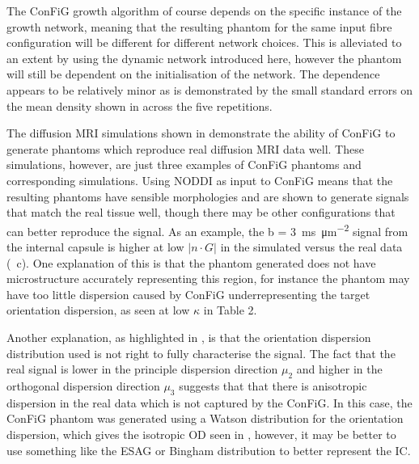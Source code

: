 
The \ac{ConFiG} growth algorithm of course depends on the specific instance of the growth network, meaning that the resulting phantom for the same input fibre configuration will be different for different network choices. This is alleviated to an extent by using the dynamic network introduced here, however the phantom will still be dependent on the initialisation of the network. The dependence appears to be relatively minor as is demonstrated by the small standard errors on the mean density shown in  across the five repetitions.

The diffusion \ac{MRI} simulations shown in  demonstrate the ability of \ac{ConFiG} to generate phantoms which reproduce real diffusion \ac{MRI} data well. These simulations, however, are just three examples of \ac{ConFiG} phantoms and corresponding simulations. Using \ac{NODDI} as input to \ac{ConFiG} means that the resulting phantoms have sensible morphologies and are shown to generate signals that match the real tissue well, though there may be other configurations that can better reproduce the signal. As an example, the b = \SI{3}{\milli\second\per\micro\metre\squared} signal from the internal capsule is higher at low $|n\cdot G|$ in the simulated versus the real data (~c). One explanation of this is that the phantom generated does not have microstructure accurately representing this region, for instance the phantom may have too little dispersion caused by \ac{ConFiG} underrepresenting the target orientation dispersion, as seen at low $\kappa$ in Table 2.

Another explanation, as highlighted in , is that the orientation dispersion distribution used is not right to fully characterise the signal.
The fact that the real signal is lower in the principle dispersion direction $\mu_2$ and higher in the orthogonal dispersion direction $\mu_3$ suggests that that there is anisotropic dispersion in the real data which is not captured by the \ac{ConFiG}.
In this case, the \ac{ConFiG} phantom was generated using a Watson distribution for the orientation dispersion, which gives the isotropic \ac{OD} seen in , however, it may be better to use something like the \ac{ESAG} or Bingham distribution to better represent the \ac{IC}.

